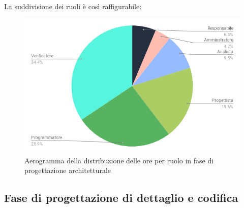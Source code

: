         \pagebreak

        La suddivisione dei ruoli è così raffigurabile:
        \begin{figure}[H]
            \centering
            \includegraphics[scale=0.6]{immagini/pa_pie.png}
            \caption{Aerogramma della distribuzione delle ore per ruolo in fase di progettazione architetturale}
        \end{figure}

    \subsection{Fase di progettazione di dettaglio e codifica}
